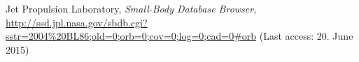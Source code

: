 \documentclass[11pt, a4paper]{article}
\numberwithin{equation}{section}
\begin{document}
\FloatBarrier
\vspace{\fill}
\begin{thebibliography}{19}
	
	Jet Propulsion Laboratory,
	\emph{Small-Body Database Browser},\\
	\url{http://ssd.jpl.nasa.gov/sbdb.cgi?sstr=2004%20BL86;old=0;orb=0;cov=0;log=0;cad=0#orb} (Last access: 20. June 2015)
\end{thebibliography}

\end{document}
